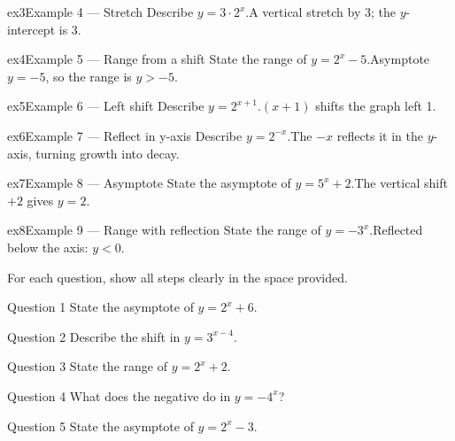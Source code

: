\documentclass[11pt]{article}
\begin{document}
\begin{example}{ex3}{Example 4 --- Stretch}
Describe $y=3\cdot2^{x}$.\soln A vertical stretch by 3; the $y$-intercept is $3$.
\end{example}

\begin{example}{ex4}{Example 5 --- Range from a shift}
State the range of $y=2^{x}-5$.\soln Asymptote $y=-5$, so the range is $y>-5$.
\end{example}

\begin{example}{ex5}{Example 6 --- Left shift}
Describe $y=2^{x+1}$.\soln $(x+1)$ shifts the graph left 1.
\end{example}

\begin{example}{ex6}{Example 7 --- Reflect in y-axis}
Describe $y=2^{-x}$.\soln The $-x$ reflects it in the $y$-axis, turning growth into decay.
\end{example}

\begin{example}{ex7}{Example 8 --- Asymptote}
State the asymptote of $y=5^{x}+2$.\soln The vertical shift $+2$ gives $y=2$.
\end{example}

\begin{example}{ex8}{Example 9 --- Range with reflection}
State the range of $y=-3^{x}$.\soln Reflected below the axis: $y<0$.
\end{example}

\clearpage
{}
For each question, show all steps clearly in the space provided.

\begin{qbox}{Question 1}
State the asymptote of $y=2^{x}+6$.\workspace{2.4cm}
\end{qbox}

\begin{qbox}{Question 2}
Describe the shift in $y=3^{x-4}$.\workspace{2.4cm}
\end{qbox}

\begin{qbox}{Question 3}
State the range of $y=2^{x}+2$.\workspace{2.4cm}
\end{qbox}

\begin{qbox}{Question 4}
What does the negative do in $y=-4^{x}$?\workspace{2.4cm}
\end{qbox}

\begin{qbox}{Question 5}
State the asymptote of $y=2^{x}-3$.\workspace{2.4cm}
\end{qbox}
\end{document}
